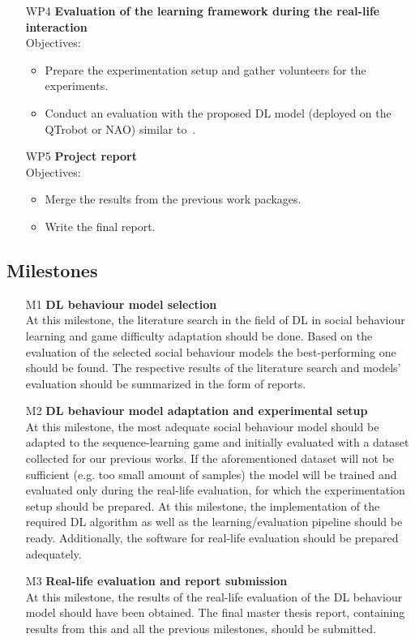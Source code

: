 \documentclass[thesis]{mas_proposal}
\begin{document}
\begin{enumerate}
\begin{itemize}
	\end{itemize}
	\item [WP4] \textbf{Evaluation of the learning framework during the real-life interaction} \\
	Objectives:
	\begin{itemize}
		\item Prepare the experimentation setup and gather volunteers for the experiments. 
		\item Conduct an evaluation with the proposed DL model (deployed on the QTrobot or NAO) similar to~\cite{Qureshi2016,romeo2021human}.
	\end{itemize}
	\item [WP5] \textbf{Project report} \\
	Objectives:
	\begin{itemize}
		\item Merge the results from the previous work packages.
		\item Write the final report.
	\end{itemize}
\end{enumerate}

\subsection{Milestones}
\begin{enumerate}
	\item[M1] \textbf{DL behaviour model selection} \\
	At this milestone, the literature search in the field of DL in social behaviour learning and game difficulty adaptation should be done. Based on the evaluation of the selected social behaviour models the best-performing one should be found. The respective results of the literature search and models' evaluation should be summarized in the form of reports.
	\item[M2] \textbf{DL behaviour model adaptation and experimental setup} \\
	At this milestone, the most adequate social behaviour model should be adapted to the sequence-learning game and initially evaluated with a dataset collected for our previous works. If the aforementioned dataset will not be sufficient (e.g. too small amount of samples) the model will be trained and evaluated only during the real-life evaluation, for which the experimentation setup should be prepared. At this milestone, the implementation of the required DL algorithm as well as the learning/evaluation pipeline should be ready. Additionally, the software for real-life evaluation should be prepared adequately.
	\item[M3] \textbf{Real-life evaluation and report submission} \\
	At this milestone, the results of the real-life evaluation of the DL behaviour model should have been obtained. The final master thesis report, containing results from this and all the previous milestones, should be submitted.
\end{enumerate}
\end{document}
